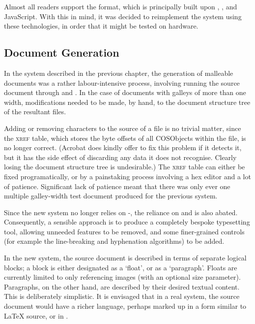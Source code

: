 Almost all \ebook{} readers support the \epub{} format, which is principally built upon \html{}, \css{}, and JavaScript. With this in mind, it was decided to reimplement the system using these technologies, in order that it might be tested on \ebook{} hardware. 



\subsection{Document Generation}
\label{sec:docgen}




In the system described in the previous chapter, the generation of malleable documents was a rather labour-intensive process, involving running the source document through \troff{} and \pdfdit{}. In the case of documents with galleys of more than one width, modifications needed to be made, by hand, to the document structure tree of the resultant \pdf{} files.

Adding or removing characters to the source of a \pdf{} file is no trivial matter, since the \textsc{xref} table, which stores the byte offsets of all \glspl{COSObject} within the file, is no longer correct. (Acrobat does kindly offer to fix this problem if it detects it, but it has the side effect of discarding any data it does not recognise. Clearly losing the document structure tree is undesirable.) The \textsc{xref} table can either be fixed programatically, or by a painstaking process involving a hex editor and a lot of patience. Significant lack of patience meant that there was only ever one multiple galley-width test document produced for the previous system.

Since the new system no longer relies on \COG{}-\pdf{}, the reliance on \troff{} and \pdfdit{} is also abated. Consequently, a sensible approach is to produce a completely bespoke typesetting tool, allowing unneeded features to be removed, and some finer-grained controls (for example the line-breaking and hyphenation algorithms) to be added.



In the new system, the source document is described in terms of separate logical blocks; a block is either designated as a `float', or as a `paragraph'. Floats are currently limited to only referencing images (with an optional size parameter). Paragraphs, on the other hand, are described by their desired textual content. This is deliberately simplistic. It is envisaged that in a real system, the source document would have a richer language, perhaps marked up in a form similar to \LaTeX{} source, or in \xml{}.

